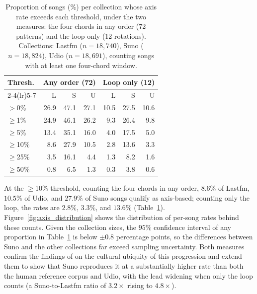 \documentclass{article}
\newcommand{\rev}[1]{{\color{r2}#1}} %
\begin{document}
\begin{table}[ht]
\centering
\footnotesize
\caption{\rev{Proportion of songs (\%) per collection whose axis rate exceeds each threshold, under the two measures: the four chords in any order (72 patterns) and the loop only (12 rotations). Collections: Lastfm ($n=18{,}740$), Suno ($n=18{,}824$), Udio ($n=18{,}691$), counting songs with at least one four-chord window.}}
\label{tab:axis_classification}
\begin{tabular}{lrrrrrr}
\toprule
\textbf{Thresh.}
  & \multicolumn{3}{c}{\textbf{\rev{Any order (72)}}}
  & \multicolumn{3}{c}{\textbf{\rev{Loop only (12)}}} \\
\cmidrule(lr){2-4}\cmidrule(lr){5-7}
 & \rev{L} & \rev{S} & \rev{U} & \rev{L} & \rev{S} & \rev{U} \\
\midrule
\rev{$>$0\%}     & \rev{26.9} & \rev{47.1} & \rev{27.1} & \rev{10.5} & \rev{27.5} & \rev{10.6} \\
\rev{$\geq$1\%}  & \rev{24.9} & \rev{46.1} & \rev{26.2} & \rev{9.3}  & \rev{26.4} & \rev{9.8} \\
\rev{$\geq$5\%}  & \rev{13.4} & \rev{35.1} & \rev{16.0} & \rev{4.0}  & \rev{17.5} & \rev{5.0} \\
\rev{$\geq$10\%} & \rev{8.6}  & \rev{27.9} & \rev{10.5} & \rev{2.8}  & \rev{13.6} & \rev{3.3} \\
\rev{$\geq$25\%} & \rev{3.5}  & \rev{16.1} & \rev{4.4}  & \rev{1.3}  & \rev{8.2}  & \rev{1.6} \\
\rev{$\geq$50\%} & \rev{0.8}  & \rev{6.5}  & \rev{1.3}  & \rev{0.3}  & \rev{3.8}  & \rev{0.6} \\
\bottomrule
\end{tabular}
\end{table}

\rev{At the $\geq$10\% threshold, counting the four chords in any order, $8.6\%$ of Lastfm, $10.5\%$ of Udio, and $27.9\%$ of Suno songs qualify as axis-based; counting only the loop, the rates are $2.8\%$, $3.3\%$, and $13.6\%$ (Table~\ref{tab:axis_classification}). Figure~\ref{fig:axis_distribution} shows the distribution of per-song rates behind these counts. Given the collection sizes, the $95\%$ confidence interval of any proportion in Table~\ref{tab:axis_classification} is below $\pm0.8$ percentage points, so the differences between Suno and the other collections far exceed sampling uncertainty. Both measures confirm the findings of \citet{richards2017tonal} on the cultural ubiquity of this progression and extend them to show that Suno reproduces it at a substantially higher rate than both the human reference corpus and Udio, with the lead widening when only the loop counts (a Suno-to-Lastfm ratio of $3.2\times$ rising to $4.8\times$).}
\end{document}
